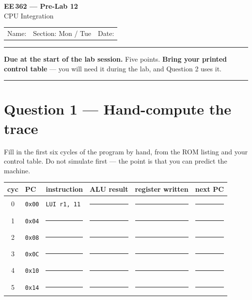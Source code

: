 \documentclass[11pt]{article}
\newcommand{\code}[1]{\texttt{#1}}
\begin{document}
\begin{center}
{\Large\bfseries EE\,362 --- Pre-Lab 12}\\[2pt]
{\large CPU Integration}\\[6pt]
\begin{tabular}{@{}p{6.5cm}p{4cm}p{4cm}@{}}
Name: \hrulefill & Section: Mon / Tue & Date: \hrulefill
\end{tabular}
\end{center}

\vspace{2pt}\hrule\vspace{4pt}

{\small\textbf{Due at the start of the lab session.} Five points. \textbf{Bring
your printed control table} --- you will need it during the lab, and Question 2
uses it.}

\vspace{4pt}\hrule

\section*{Question 1 --- Hand-compute the trace}

Fill in the first six cycles of the program by hand, from the ROM listing and
your control table. Do not simulate first --- the point is that you can predict
the machine.

\begin{center}
\small
\begin{tabular}{clllll}
\toprule
cyc & PC & instruction & ALU result & register written & next PC \\
\midrule
0 & \code{0x00} & \code{LUI r1, 11} & \rule{2.2cm}{0.4pt} & \rule{2.4cm}{0.4pt} & \rule{1.6cm}{0.4pt} \\[6pt]
1 & \code{0x04} & \rule{2.6cm}{0.4pt} & \rule{2.2cm}{0.4pt} & \rule{2.4cm}{0.4pt} & \rule{1.6cm}{0.4pt} \\[6pt]
2 & \code{0x08} & \rule{2.6cm}{0.4pt} & \rule{2.2cm}{0.4pt} & \rule{2.4cm}{0.4pt} & \rule{1.6cm}{0.4pt} \\[6pt]
3 & \code{0x0C} & \rule{2.6cm}{0.4pt} & \rule{2.2cm}{0.4pt} & \rule{2.4cm}{0.4pt} & \rule{1.6cm}{0.4pt} \\[6pt]
4 & \code{0x10} & \rule{2.6cm}{0.4pt} & \rule{2.2cm}{0.4pt} & \rule{2.4cm}{0.4pt} & \rule{1.6cm}{0.4pt} \\[6pt]
5 & \code{0x14} & \rule{2.6cm}{0.4pt} & \rule{2.2cm}{0.4pt} & \rule{2.4cm}{0.4pt} & \rule{1.6cm}{0.4pt} \\
\bottomrule
\end{tabular}
\end{center}
\end{document}
